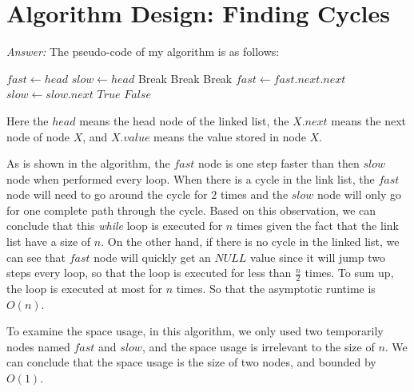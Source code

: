 \documentclass[11pt]{article}
\begin{document}
\section{Algorithm Design: Finding Cycles}
	\emph{Answer:} The pseudo-code of my algorithm is as follows:

	\begin{algorithmic}
		\State $fast\gets head$
		\State $slow\gets head$
				\State Break
			\EndIf
				\State Break
			\EndIf
				\State Break
			\EndIf
			\State $fast \gets fast.next.next$
			\State $slow \gets slow.next$
				\State \Return $True$
			\EndIf
		\EndWhile
		\State \Return $False$
	\end{algorithmic}

	Here the $head$ means the head node of the linked list, the $X.next$ means the next node of node $X$, and $X.value$ means the value stored in node $X$.
	
	As is shown in the algorithm, the $fast$ node is one step faster than then $slow$ node when performed every loop. When there is a cycle in the link list, the $fast$ node will need to go around the cycle for $2$ times and the $slow$ node will only go for one complete path through the cycle. Based on this observation, we can conclude that this \emph{while} loop is executed for $n$ times given the fact that the link list have a size of $n$. On the other hand, if there is no cycle in the linked list, we can see that $fast$ node will quickly get an $NULL$ value since it will jump two steps every loop, so that the loop is executed for less than $\frac{n}{2}$ times. To sum up, the loop is executed at most for $n$ times. So that the asymptotic runtime is $O(n)$. 
	
	To examine the space usage, in this algorithm, we only used two temporarily nodes named $fast$ and $slow$, and the space usage is irrelevant to the size of $n$. We can conclude that the space usage is the size of two nodes, and bounded by $O(1)$.
\end{document}

